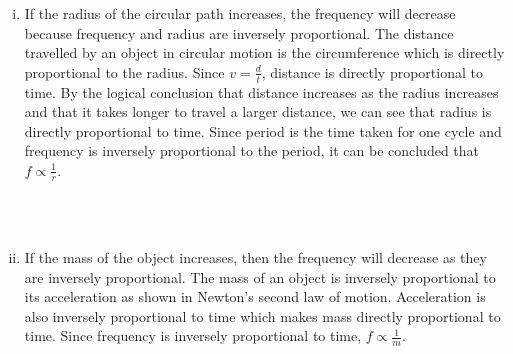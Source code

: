 \documentclass{article}[12pt]
\begin{document}
\begin{enumerate}[i.]
\\
\item
If the radius of the circular path increases, the frequency will decrease because frequency and radius are inversely proportional. The distance travelled by an object in circular motion is the circumference which is directly proportional to the radius. Since $v=\frac{d}{t}$, distance is directly proportional to time. By the logical conclusion that distance increases as the radius increases and that it takes longer to travel a larger distance, we can see that radius is directly proportional to time. Since period is the time taken for one cycle and frequency is inversely proportional to the period, it can be concluded that $f\propto\frac{1}{r}$.\\\\
\\
\item
If the mass of the object increases, then the frequency will decrease as they are inversely proportional. The mass of an object is inversely proportional to its acceleration as shown in Newton's second law of motion. Acceleration is also inversely proportional to time which makes mass directly proportional to time. Since frequency is inversely proportional to time, $f\propto \frac{1}{m}$.\\\\
\\
\end{enumerate}
\end{document}
